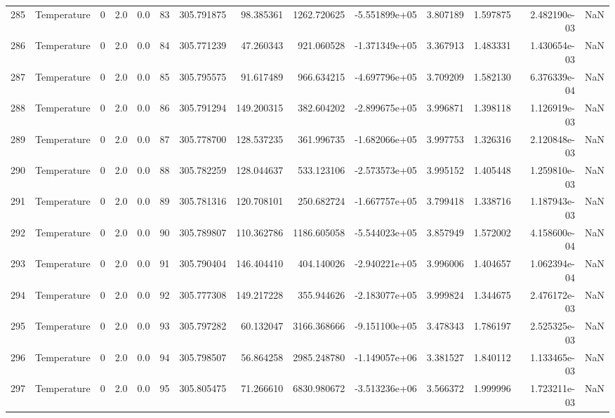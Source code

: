 \begin{tabular}{llrrrrrrrrrrrr}
285 &  Temperature &       0 &  2.0 &  0.0 &   83 &  305.791875 &    98.385361 &    1262.720625 & -5.551899e+05 &  3.807189 &  1.597875 &  2.482190e-03 &      NaN \\
286 &  Temperature &       0 &  2.0 &  0.0 &   84 &  305.771239 &    47.260343 &     921.060528 & -1.371349e+05 &  3.367913 &  1.483331 &  1.430654e-03 &      NaN \\
287 &  Temperature &       0 &  2.0 &  0.0 &   85 &  305.795575 &    91.617489 &     966.634215 & -4.697796e+05 &  3.709209 &  1.582130 &  6.376339e-04 &      NaN \\
288 &  Temperature &       0 &  2.0 &  0.0 &   86 &  305.791294 &   149.200315 &     382.604202 & -2.899675e+05 &  3.996871 &  1.398118 &  1.126919e-03 &      NaN \\
289 &  Temperature &       0 &  2.0 &  0.0 &   87 &  305.778700 &   128.537235 &     361.996735 & -1.682066e+05 &  3.997753 &  1.326316 &  2.120848e-03 &      NaN \\
290 &  Temperature &       0 &  2.0 &  0.0 &   88 &  305.782259 &   128.044637 &     533.123106 & -2.573573e+05 &  3.995152 &  1.405448 &  1.259810e-03 &      NaN \\
291 &  Temperature &       0 &  2.0 &  0.0 &   89 &  305.781316 &   120.708101 &     250.682724 & -1.667757e+05 &  3.799418 &  1.338716 &  1.187943e-03 &      NaN \\
292 &  Temperature &       0 &  2.0 &  0.0 &   90 &  305.789807 &   110.362786 &    1186.605058 & -5.544023e+05 &  3.857949 &  1.572002 &  4.158600e-04 &      NaN \\
293 &  Temperature &       0 &  2.0 &  0.0 &   91 &  305.790404 &   146.404410 &     404.140026 & -2.940221e+05 &  3.996006 &  1.404657 &  1.062394e-04 &      NaN \\
294 &  Temperature &       0 &  2.0 &  0.0 &   92 &  305.777308 &   149.217228 &     355.944626 & -2.183077e+05 &  3.999824 &  1.344675 &  2.476172e-03 &      NaN \\
295 &  Temperature &       0 &  2.0 &  0.0 &   93 &  305.797282 &    60.132047 &    3166.368666 & -9.151100e+05 &  3.478343 &  1.786197 &  2.525325e-03 &      NaN \\
296 &  Temperature &       0 &  2.0 &  0.0 &   94 &  305.798507 &    56.864258 &    2985.248780 & -1.149057e+06 &  3.381527 &  1.840112 &  1.133465e-03 &      NaN \\
297 &  Temperature &       0 &  2.0 &  0.0 &   95 &  305.805475 &    71.266610 &    6830.980672 & -3.513236e+06 &  3.566372 &  1.999996 &  1.723211e-03 &      NaN \\

\end{tabular}
